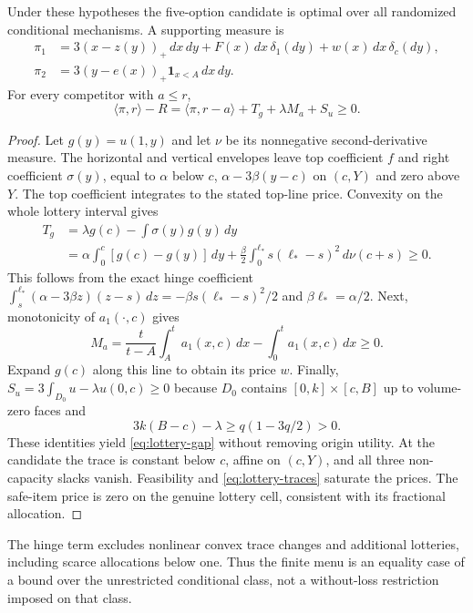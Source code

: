 \begin{theorem}\label{thm:lottery}
Under these hypotheses the five-option candidate is optimal over all
randomized conditional mechanisms. A supporting measure is
\[
\begin{aligned}
\pi_1&=3(x-z(y))_+\,dx\,dy+F(x)\,dx\,\delta_1(dy)
                         +w(x)\,dx\,\delta_c(dy),\\
\pi_2&=3(y-e(x))_+\mathbf1_{x<A}\,dx\,dy.
\end{aligned}
\]
For every competitor with $a\le r$,
\begin{equation}\label{eq:lottery-gap}
\langle\pi,r\rangle-R
 =\langle\pi,r-a\rangle+T_g+\lambda M_a+S_u\ge0.
\end{equation}
\end{theorem}
\begin{proof}
Let $g(y)=u(1,y)$ and let $\nu$ be its nonnegative second-derivative
measure. The horizontal and vertical envelopes leave top coefficient $f$
and right coefficient $\sigma(y)$, equal to $\alpha$ below $c$,
$\alpha-3\beta(y-c)$ on $(c,Y)$ and zero above $Y$.
The top coefficient integrates to the stated top-line price. Convexity on
the whole lottery interval gives
\[
\begin{split}
T_g&=\lambda g(c)-\int\sigma(y)g(y)\,dy\\
&=\alpha\int_0^c[g(c)-g(y)]\,dy
 +\frac\beta2\int_0^{\ell_*}s(\ell_*-s)^2\,d\nu(c+s)\ge0.
\end{split}
\]
This follows from the exact hinge coefficient
$\int_s^{\ell_*}(\alpha-3\beta z)(z-s)\,dz
=-\beta s(\ell_*-s)^2/2$ and $\beta\ell_*=\alpha/2$.
Next, monotonicity of $a_1(\cdot,c)$ gives
\[
M_a=\frac{t}{t-A}\int_A^t a_1(x,c)\,dx-
                     \int_0^t a_1(x,c)\,dx\ge0.
\]
Expand $g(c)$ along this line to obtain its price $w$.
Finally,
$S_u=3\int_{D_0}u-\lambda u(0,c)\ge0$ because
$D_0$ contains $[0,k]\times[c,B]$ up to volume-zero faces and
\[
3k(B-c)-\lambda\ge q(1-3q/2)>0.
\]
These identities yield \eqref{eq:lottery-gap} without removing origin
utility. At the candidate the trace is constant below $c$, affine on
$(c,Y)$, and all three non-capacity slacks vanish. Feasibility and
\eqref{eq:lottery-traces} saturate the prices. The safe-item price is zero
on the genuine lottery cell, consistent with its fractional allocation.
\end{proof}

The hinge term excludes nonlinear convex trace changes and additional
lotteries, including scarce allocations below one. Thus the finite menu is
an equality case of a bound over the unrestricted conditional class, not a
without-loss restriction imposed on that class.

